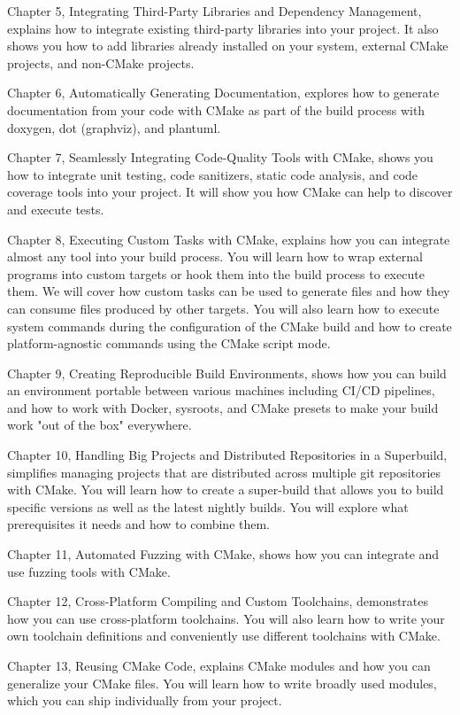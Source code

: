 Chapter 5, Integrating Third-Party Libraries and Dependency Management, explains how to integrate existing third-party libraries into your project. It also shows you how to add libraries already installed on your system, external CMake projects, and non-CMake projects.

Chapter 6, Automatically Generating Documentation, explores how to generate documentation from your code with CMake as part of the build process with doxygen, dot (graphviz), and plantuml.

Chapter 7, Seamlessly Integrating Code-Quality Tools with CMake, shows you how to integrate unit testing, code sanitizers, static code analysis, and code coverage tools into your project. It will show you how CMake can help to discover and execute tests.

Chapter 8, Executing Custom Tasks with CMake, explains how you can integrate almost any tool into your build process. You will learn how to wrap external programs into custom targets or hook them into the build process to execute them. We will cover how custom tasks can be used to generate files and how they can consume files produced by other targets. You will also learn how to execute system commands during the configuration of the CMake build and how to create platform-agnostic commands using the CMake script mode.

Chapter 9, Creating Reproducible Build Environments, shows how you can build an environment portable between various machines including CI/CD pipelines, and how to work with Docker, sysroots, and CMake presets to make your build work "out of the box" everywhere.

Chapter 10, Handling Big Projects and Distributed Repositories in a Superbuild, simplifies managing projects that are distributed across multiple git repositories with CMake. You will learn how to create a super-build that allows you to build specific versions as well as the latest nightly builds. You will explore what prerequisites it needs and how to combine them.

Chapter 11, Automated Fuzzing with CMake, shows how you can integrate and use fuzzing tools with CMake.

Chapter 12, Cross-Platform Compiling and Custom Toolchains, demonstrates how you can use cross-platform toolchains. You will also learn how to write your own toolchain definitions and conveniently use different toolchains with CMake.

Chapter 13, Reusing CMake Code, explains CMake modules and how you can generalize your CMake files. You will learn how to write broadly used modules, which you can ship individually from your project.

